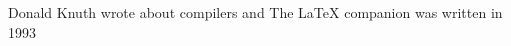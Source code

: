 \documentclass{article}
\begin{document}
Donald Knuth wrote about compilers\cite{knuthwebsite} and The LaTeX companion was written in 1993\cite{latexcompanion}



\end{document}
